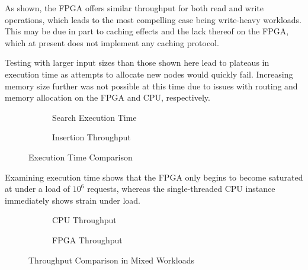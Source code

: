 As shown, the FPGA offers similar throughput for both read and write operations,
which leads to the most compelling case being write-heavy workloads. This may be
due in part to caching effects and the lack thereof on the FPGA, which at
present does not implement any caching protocol.

Testing with larger input sizes than those shown here lead to plateaus in
execution time as attempts to allocate new nodes would quickly fail. Increasing
memory size further was not possible at this time due to issues with routing and
memory allocation on the FPGA and CPU, respectively.

\begin{figure}[H]
	\centering
	\begin{subfigure}{7.5cm}
		\centering
		
		\caption{Search Execution Time}
		\label{fig:search-time-comparison}
	\end{subfigure}
	\begin{subfigure}{7.5cm}
		\centering
		
		\caption{Insertion Throughput}
		\label{fig:insert-time-comparison}
	\end{subfigure}
	\caption{Execution Time Comparison}
	\label{fig:time-comparison}
\end{figure}

Examining execution time shows that the FPGA only begins to become saturated at
under a load of $10^6$ requests, whereas the single-threaded CPU instance
immediately shows strain under load.

\begin{figure}[H]
	\centering
	\begin{subfigure}{7.5cm}
		\centering
		
		\caption{CPU Throughput}
		\label{fig:mixed-throughput-cpu}
	\end{subfigure}
	\begin{subfigure}{7.5cm}
		\centering
		
		\caption{FPGA Throughput}
		\label{fig:mixed-throughput-fpga}
	\end{subfigure}
	\caption{Throughput Comparison in Mixed Workloads}
	\label{fig:rw-comparison}
\end{figure}
